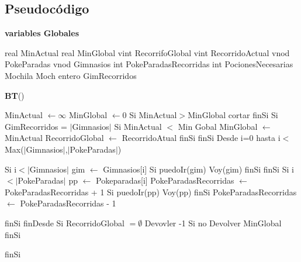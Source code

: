 \documentclass[spanish,12pt]{article}
\begin{document}

\subsection{Pseudocódigo}

\begin{algorithm}[H]{\textbf{variables Globales}}
	\begin{algorithmic}[1]
		\State real MinActual 
		\State real MinGlobal
		\State vint RecorrifoGlobal
		\State vint RecorridoActual
		\State vnod PokeParadas
		\State vnod Gimnasios
		\State int PokeParadasRecorridas
		\State int PocionesNecesarias		
		\State Mochila Moch	
		\State entero GimRecorridos	
	
	\end{algorithmic}
\end{algorithm}

\begin{algorithm}[H]{\textbf{BT}()}
	\begin{algorithmic}[1]
		\State MinActual $\gets \infty$
		\State MinGlobal $\gets 0$
		\State Si  MinActual$>$MinGlobal  
			 \State \quad cortar
		\State finSi
		\State Si GimRecorridos = $|$Gimnasios$|$ 
		\State \quad Si MinActual $<$ Min Gobal
		\State \qquad MinGlobal $\gets$ MinActual
		\State \qquad RecorridoGlobal $\gets$ RecorridoAtual
		\State \quad finSi
		\State finSi
		\State Desde i=0 hasta i$<$Max($|$Gimnasios$|$,$|$PokeParadas$|$)
	
		\State \quad Si i$< |$Gimnasios$|$
		\State \quad \quad gim $\gets$ Gimnasios[i]
		\State \quad \quad Si puedoIr(gim)
		\State \quad \quad \quad Voy(gim)
 		\State \quad \quad finSi	
		\State \quad finSi
		\State \quad Si i $< |$PokeParadas$|$
		\State \qquad pp $\gets$ Pokeparadas[i]
		\State \qquad PokeParadasRecorridas $\gets$ PokeParadasRecorridas + 1 
		\State \qquad Si puedoIr(pp)
		\State \qquad \quad Voy(pp) 	
		\State \qquad finSi
		\State \qquad PokeParadasRecorridas $\gets$ PokeParadasRecorridas - 1 

		\State \quad finSi 
		\State finDesde
		\State Si RecorridoGlobal $= \emptyset$
		\State \quad Devovler -1
		\State Si no
		\State \quad Devolver MinGlobal
		\State finSi
  		
		
		
		\State finSi %
	\end{algorithmic}
\end{algorithm}
\end{document}

